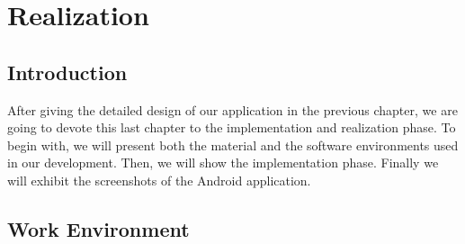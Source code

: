 
\chapter{Realization} %

\label{Chapter5} %
\section{Introduction}
After giving the detailed design of our application in the previous chapter, we are going to devote this last chapter to the implementation and realization phase. To begin with, we will present both the material and the software environments used in our development. Then, we will show the implementation phase. Finally we will exhibit the screenshots of the Android application.
\section{Work Environment}
